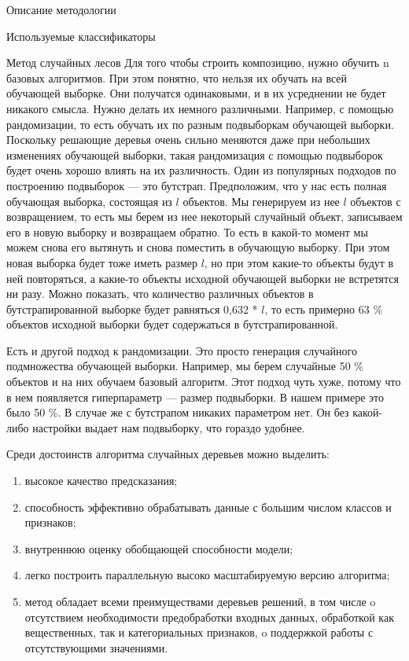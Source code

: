 \begin{section}{Описание методологии}
\begin{subsection}{Используемые классификаторы}
\begin{subsubsection}{Метод случайных лесов}
 Для того чтобы строить композицию, нужно обучить n базовых алгоритмов. При этом понятно, что нельзя их обучать на всей обучающей выборке. Они получатся одинаковыми, и в их усреднении не будет никакого смысла. Нужно делать их немного различными. Например, с помощью рандомизации, то есть обучать их по разным подвыборкам обучающей выборки. Поскольку решающие деревья очень сильно меняются даже при небольших изменениях обучающей выборки, такая рандомизация с помощью подвыборок будет очень хорошо влиять на их различность. Один из популярных подходов по построению подвыборок — это бутстрап. Предположим, что у нас есть полная обучающая выборка, состоящая из $l$ объектов. Мы генерируем из нее $l$ объектов с возвращением, то есть мы берем из нее некоторый случайный объект, записываем его в новую выборку и возвращаем обратно. То есть в какой-то момент мы можем снова его вытянуть и снова поместить в обучающую выборку. При этом новая выборка будет тоже иметь размер $l$, но при этом какие-то объекты будут в ней повторяться, а какие-то объекты исходной обучающей выборки не встретятся ни разу.  Можно показать, что количество различных объектов в бутстрапированной выборке будет равняться 0,632 * $l$, то есть примерно 63 \% объектов исходной выборки будет содержаться в бутстрапированной.

 Есть и другой подход к рандомизации. Это просто генерация случайного подмножества обучающей выборки. Например, мы берем случайные 50 \% объектов и на них обучаем базовый алгоритм. Этот подход чуть хуже, потому что в нем появляется гиперпараметр — размер подвыборки. В нашем примере это было 50 \%. В случае же с бутстрапом никаких параметром нет. Он без какой-либо настройки выдает нам подвыборку, что гораздо удобнее.

Среди достоинств алгоритма случайных деревьев можно выделить:
\begin{enumerate}
  \item высокое качество предсказания;
  \item способность эффективно обрабатывать данные с большим числом классов и признаков;
  \item внутреннюю оценку обобщающей способности модели;
  \item	легко построить параллельную высоко масштабируемую версию алгоритма;
  \item	метод обладает всеми преимуществами деревьев решений, в том числе
  o	отсутствием необходимости предобработки входных данных, обработкой как вещественных, так и категориальных признаков,
  o	поддержкой работы с отсутствующими значениями.


\end{enumerate}
\end{subsubsection}
\end{subsection}
\end{section}
